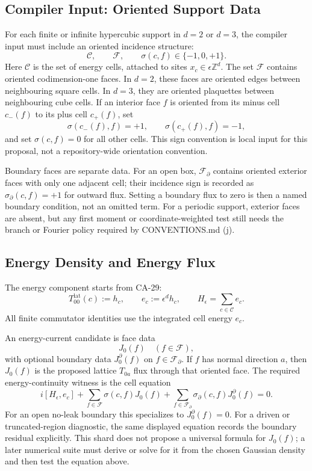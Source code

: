 \subsection{Compiler Input: Oriented Support Data}

For each finite or infinite hypercubic support in \(d=2\) or \(d=3\), the
compiler input must include an oriented incidence structure:
\[
\mathcal C,\qquad \mathcal F,\qquad
\sigma(c,f)\in\{-1,0,+1\}.
\]
Here \(\mathcal C\) is the set of energy cells, attached to sites \(x_c\in
\epsilon\mathbb Z^d\).  The set \(\mathcal F\) contains oriented codimension-one
faces.  In \(d=2\), these faces are oriented edges between neighbouring square
cells.  In \(d=3\), they are oriented plaquettes between neighbouring cube
cells.  If an interior face \(f\) is oriented from its minus cell \(c_-(f)\) to
its plus cell \(c_+(f)\), set
\[
  \sigma(c_-(f),f)=+1,\qquad
  \sigma(c_+(f),f)=-1,
\]
and set \(\sigma(c,f)=0\) for all other cells.  This sign convention is local
input for this proposal, not a repository-wide orientation convention.

Boundary faces are separate data.  For an open box, \(\mathcal F_\partial\)
contains oriented exterior faces with only one adjacent cell; their incidence
sign is recorded as \(\sigma_\partial(c,f)=+1\) for outward flux.  Setting a
boundary flux to zero is then a named boundary condition, not an omitted term.
For a periodic support, exterior faces are absent, but any first moment or
coordinate-weighted test still needs the branch or Fourier policy required by
CONVENTIONS.md (j).

\subsection{Energy Density and Energy Flux}

The energy component starts from CA-29:
\[
  T_{00}^{\mathrm{lat}}(c):=h_c,\qquad
  e_c:=\epsilon^d h_c,\qquad
  H_\epsilon=\sum_{c\in\mathcal C}e_c .
\]
All finite commutator identities use the integrated cell energy \(e_c\).

An energy-current candidate is face data
\[
  J_0(f)\quad (f\in\mathcal F),
\]
with optional boundary data \(J^\partial_0(f)\) on \(f\in\mathcal F_\partial\).
If \(f\) has normal direction \(a\), then \(J_0(f)\) is the proposed lattice
\(T_{0a}\) flux through that oriented face.  The required energy-continuity
witness is the cell equation
\[
  i[H_\epsilon,e_c]
  +
  \sum_{f\in\mathcal F}\sigma(c,f)J_0(f)
  +
  \sum_{f\in\mathcal F_\partial}\sigma_\partial(c,f)J^\partial_0(f)
  =0 .
\]
For an open no-leak boundary this specializes to \(J^\partial_0(f)=0\).  For a
driven or truncated-region diagnostic, the same displayed equation records the
boundary residual explicitly.  This shard does not propose a universal formula
for \(J_0(f)\); a later numerical suite must derive or solve for it from the
chosen Gaussian density and then test the equation above.

